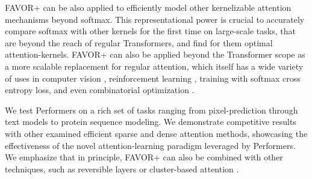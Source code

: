 FAVOR+ can be also applied to efficiently model other kernelizable attention mechanisms beyond softmax. This representational power is crucial to accurately compare softmax with other kernels for the first time on large-scale tasks, that are beyond the reach of regular Transformers, and find for them optimal attention-kernels.
FAVOR+ can also be applied beyond the Transformer scope as a more scalable replacement for regular attention, which itself has a wide variety of uses in computer vision \citep{attention_cvpr}, reinforcement learning \citep{relational}, training with softmax cross entropy loss, and even combinatorial optimization \citep{pointer}.

We test Performers on a rich set of tasks ranging from pixel-prediction through text models to protein sequence modeling. We demonstrate competitive results with other examined efficient sparse and dense attention methods, showcasing the effectiveness of the novel attention-learning paradigm leveraged by Performers. We emphasize that in principle, FAVOR+ can also be combined with other techniques, such as reversible layers \citep{reformer} or cluster-based attention \citep{routing_t}. 





 




